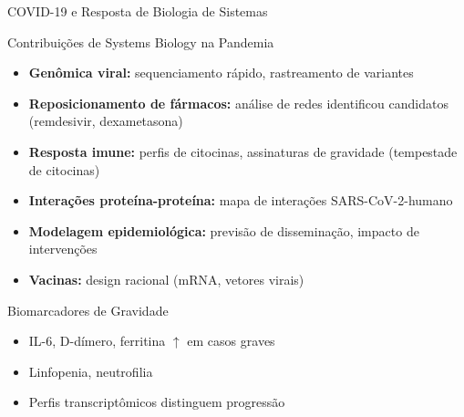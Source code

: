 \begin{frame}{COVID-19 e Resposta de Biologia de Sistemas}
\begin{block}{Contribuições de Systems Biology na Pandemia}
\begin{itemize}
    \item \textbf{Genômica viral:} sequenciamento rápido, rastreamento de variantes
    \item \textbf{Reposicionamento de fármacos:} análise de redes identificou candidatos (remdesivir, dexametasona)
    \item \textbf{Resposta imune:} perfis de citocinas, assinaturas de gravidade (tempestade de citocinas)
    \item \textbf{Interações proteína-proteína:} mapa de interações SARS-CoV-2-humano
    \item \textbf{Modelagem epidemiológica:} previsão de disseminação, impacto de intervenções
    \item \textbf{Vacinas:} design racional (mRNA, vetores virais)
\end{itemize}
\end{block}

\vspace{0.3cm}

\begin{exampleblock}{Biomarcadores de Gravidade}
\begin{itemize}
    \item IL-6, D-dímero, ferritina $\uparrow$ em casos graves
    \item Linfopenia, neutrofilia
    \item Perfis transcriptômicos distinguem progressão
\end{itemize}
\end{exampleblock}
\end{frame}

